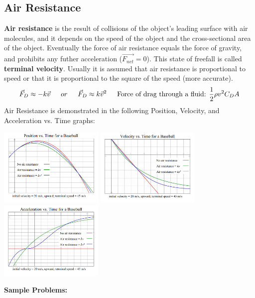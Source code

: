 \documentclass{article}
\begin{document}
  	\subsection{Air Resistance}
  		\textbf{Air resistance} is the result of collisions of the object's leading surface with air molecules, and it depends on the speed of the object and the cross-sectional area of the object. Eventually the force of air resistance equals the force of gravity, and prohibits any futher acceleration ($\vec{F_{net}}=0$). This state of freefall is called \textbf{terminal velocity}. Usually it is assumed that air resistance is proportional to speed or that it is proportional to the square of the speed (more accurate).
  		\[
        	\vec{F}_{D}\approx -k\vec{v} \indent or \indent \vec{F}_{D}\approx k\vec{v}^2
            \indent \text{Force of drag through a fluid: } \frac{1}{2}\rho v^2 C_D A
        \]
        Air Resistance is demonstrated in the following Position, Velocity, and Acceleration vs. Time graphs:\\
        \centerline{
  			\includegraphics[width=5cm]{pvt_air.png}
        	\includegraphics[width=5cm]{vvt_air.png}
        	\includegraphics[width=5cm]{avt_air.png}
        }
  		\textbf{Sample Problems:}
\end{document}
